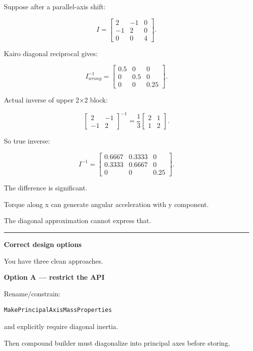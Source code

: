 Suppose after a parallel-axis shift:

\[
I=
\begin{bmatrix}
2&-1&0\\
-1&2&0\\
0&0&4
\end{bmatrix}.
\]

Kairo diagonal reciprocal gives:

\[
I^{-1}_{wrong}
=
\begin{bmatrix}
0.5&0&0\\
0&0.5&0\\
0&0&0.25
\end{bmatrix}.
\]

Actual inverse of upper 2×2 block:

\[
\begin{bmatrix}
2&-1\\
-1&2
\end{bmatrix}^{-1}
=
\frac13
\begin{bmatrix}
2&1\\
1&2
\end{bmatrix}.
\]

So true inverse:

\[
I^{-1}
=
\begin{bmatrix}
0.6667&0.3333&0\\
0.3333&0.6667&0\\
0&0&0.25
\end{bmatrix}.
\]

The difference is significant.

Torque along x can generate angular acceleration with y component.

The diagonal approximation cannot express that.

\begin{center}\rule{0.5\linewidth}{0.5pt}\end{center}

\textbf{Correct design options}

You have three clean approaches.

\textbf{Option A --- restrict the API}

Rename/constrain:

\begin{verbatim}
MakePrincipalAxisMassProperties
\end{verbatim}

and explicitly require diagonal inertia.

Then compound builder must diagonalize into principal axes before storing.

